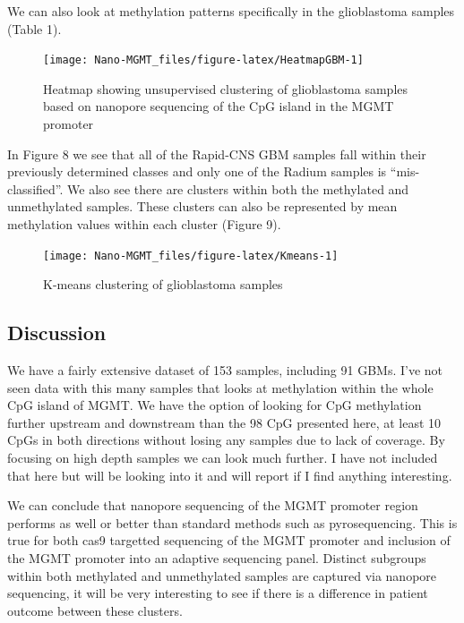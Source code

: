 \documentclass[
]{article}
\begin{document}
We can also look at methylation patterns specifically in the
glioblastoma samples (Table 1).

\begin{figure}
\texttt{[image: Nano-MGMT\_files/figure-latex/HeatmapGBM-1]} \caption{Heatmap showing unsupervised clustering of glioblastoma samples based on nanopore sequencing of the CpG island in the MGMT promoter}\label{fig:HeatmapGBM}
\end{figure}

In Figure 8 we see that all of the Rapid-CNS GBM samples fall within
their previously determined classes and only one of the Radium samples
is ``mis-classified''. We also see there are clusters within both the
methylated and unmethylated samples. These clusters can also be
represented by mean methylation values within each cluster (Figure 9).

\begin{figure}
\texttt{[image: Nano-MGMT\_files/figure-latex/Kmeans-1]} \caption{K-means clustering of glioblastoma samples}\label{fig:Kmeans}
\end{figure}

\hypertarget{discussion}{%
\subsection{Discussion}\label{discussion}}

We have a fairly extensive dataset of 153 samples, including 91 GBMs.
I've not seen data with this many samples that looks at methylation
within the whole CpG island of MGMT. We have the option of looking for
CpG methylation further upstream and downstream than the 98 CpG
presented here, at least 10 CpGs in both directions without losing any
samples due to lack of coverage. By focusing on high depth samples we
can look much further. I have not included that here but will be looking
into it and will report if I find anything interesting.

We can conclude that nanopore sequencing of the MGMT promoter region
performs as well or better than standard methods such as pyrosequencing.
This is true for both cas9 targetted sequencing of the MGMT promoter and
inclusion of the MGMT promoter into an adaptive sequencing panel.
Distinct subgroups within both methylated and unmethylated samples are
captured via nanopore sequencing, it will be very interesting to see if
there is a difference in patient outcome between these clusters.
\end{document}
